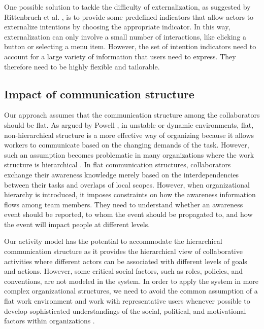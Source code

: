 One possible solution to tackle the difficulty of externalization, as suggested by Rittenbruch et al. \cite{Rittenbruch2007}, is to provide some predefined indicators that allow actors to externalize intentions by choosing the appropriate indicator. In this way, externalization can only involve a small number of interactions, like clicking a button or selecting a menu item. However, the set of intention indicators  need to account for a large variety of information that users need to express. They therefore need to be highly flexible and tailorable.

\subsection{Impact of communication structure} %
\label{sub:impact_of_communication_structure}
Our approach assumes that the communication structure among the collaborators should be flat. As argued by Powell \cite{powell2003neither}, in unstable or dynamic environments, flat, non-hierarchical structure is a more effective way of organizing because it allows workers to communicate based on the changing demands of the task. However, such an assumption becomes problematic in many organizations where the work structure is hierarchical \cite{hinds2006structures}. In flat communication structures, collaborators exchange their awareness knowledge merely based on the interdependencies between their tasks and overlaps of local scopes. However, when organizational hierarchy is introduced, it imposes constraints on how the awareness information flows among team members. They need to understand whether an awareness event should be reported, to whom the event should be propagated to, and how the event will impact people at different levels. 

Our activity model has the potential to accommodate the hierarchical communication structure as it provides the hierarchical view of collaborative activities where different actors can be associated with different levels of goals and actions. However, some critical social factors, such as roles, policies, and conventions, are not modeled in the system. In order to apply the system in more complex organizational structures,  we need to avoid the common assumption of a flat work environment and work with representative users whenever possible to develop sophisticated understandings of the social, political, and motivational factors within organizations \cite{Grudin1994}.

